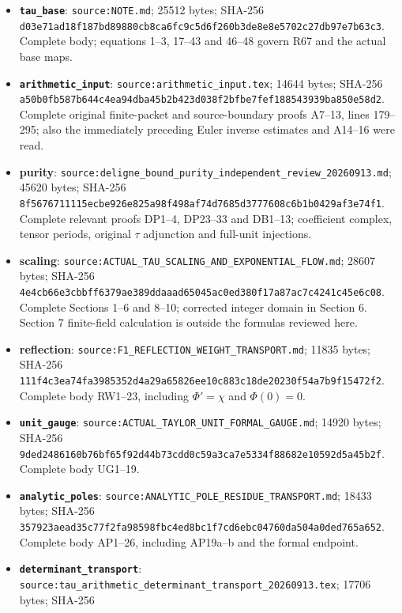 \begin{itemize}
\tightlist
\item
  \textbf{\nolinkurl{tau_base}}: \nolinkurl{source:NOTE.md}; 25512
  bytes; SHA-256
  \nolinkurl{d03e71ad18f187bd89880cb8ca6fc9c5d6f260b3de8e8e5702c27db97e7b63c3}.
  Complete body; equations 1--3, 17--43 and 46--48 govern R67 and the
  actual base maps.
\item
  \textbf{\nolinkurl{arithmetic_input}}:
  \nolinkurl{source:arithmetic_input.tex}; 14644 bytes; SHA-256
  \nolinkurl{a50b0fb587b644c4ea94dba45b2b423d038f2bfbe7fef188543939ba850e58d2}.
  Complete original finite-packet and source-boundary proofs A7--13,
  lines 179--295; also the immediately preceding Euler inverse estimates
  and A14--16 were read.
\item
  \textbf{purity}:
  \nolinkurl{source:deligne_bound_purity_independent_review_20260913.md};
  45620 bytes; SHA-256
  \nolinkurl{8f5676711115ecbe926e825a98f498af74d7685d3777608c6b1b0429af3e74f1}.
  Complete relevant proofs DP1--4, DP23--33 and DB1--13; coefficient
  complex, tensor periods, original \(\tau\) adjunction and full-unit
  injections.
\item
  \textbf{scaling}:
  \nolinkurl{source:ACTUAL_TAU_SCALING_AND_EXPONENTIAL_FLOW.md}; 28607
  bytes; SHA-256
  \nolinkurl{4e4cb66e3cbbff6379ae389ddaaad65045ac0ed380f17a87ac7c4241c45e6c08}.
  Complete Sections 1--6 and 8--10; corrected integer domain in Section
  6. Section 7 finite-field calculation is outside the formulas reviewed
  here.
\item
  \textbf{reflection}:
  \nolinkurl{source:F1_REFLECTION_WEIGHT_TRANSPORT.md}; 11835 bytes;
  SHA-256
  \nolinkurl{111f4c3ea74fa3985352d4a29a65826ee10c883c18de20230f54a7b9f15472f2}.
  Complete body RW1--23, including \(\Phi'=\chi\) and \(\Phi(0)=0\).
\item
  \textbf{\nolinkurl{unit_gauge}}:
  \nolinkurl{source:ACTUAL_TAYLOR_UNIT_FORMAL_GAUGE.md}; 14920 bytes;
  SHA-256
  \nolinkurl{9ded2486160b76bf65f92d44b73cdd0c59a3ca7e5334f88682e10592d5a45b2f}.
  Complete body UG1--19.
\item
  \textbf{\nolinkurl{analytic_poles}}:
  \nolinkurl{source:ANALYTIC_POLE_RESIDUE_TRANSPORT.md}; 18433 bytes;
  SHA-256
  \nolinkurl{357923aead35c77f2fa98598fbc4ed8bc1f7cd6ebc04760da504a0ded765a652}.
  Complete body AP1--26, including AP19a--b and the formal endpoint.
\item
  \textbf{\nolinkurl{determinant_transport}}:
  \nolinkurl{source:tau_arithmetic_determinant_transport_20260913.tex};
  17706 bytes; SHA-256

\end{itemize}
